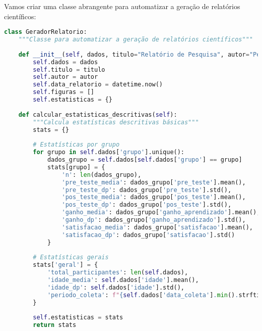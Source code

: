 \begin{examplebox}
Vamos criar uma classe abrangente para automatizar a geração de relatórios científicos:
\end{examplebox}

\begin{pythonbox}
\begin{lstlisting}[language=Python]
class GeradorRelatorio:
    """Classe para automatizar a geração de relatórios científicos"""
    
    def __init__(self, dados, titulo="Relatório de Pesquisa", autor="Pesquisador"):
        self.dados = dados
        self.titulo = titulo
        self.autor = autor
        self.data_relatorio = datetime.now()
        self.figuras = []
        self.estatisticas = {}
        
    def calcular_estatisticas_descritivas(self):
        """Calcula estatísticas descritivas básicas"""
        stats = {}
        
        # Estatísticas por grupo
        for grupo in self.dados['grupo'].unique():
            dados_grupo = self.dados[self.dados['grupo'] == grupo]
            stats[grupo] = {
                'n': len(dados_grupo),
                'pre_teste_media': dados_grupo['pre_teste'].mean(),
                'pre_teste_dp': dados_grupo['pre_teste'].std(),
                'pos_teste_media': dados_grupo['pos_teste'].mean(),
                'pos_teste_dp': dados_grupo['pos_teste'].std(),
                'ganho_media': dados_grupo['ganho_aprendizado'].mean(),
                'ganho_dp': dados_grupo['ganho_aprendizado'].std(),
                'satisfacao_media': dados_grupo['satisfacao'].mean(),
                'satisfacao_dp': dados_grupo['satisfacao'].std()
            }
        
        # Estatísticas gerais
        stats['geral'] = {
            'total_participantes': len(self.dados),
            'idade_media': self.dados['idade'].mean(),
            'idade_dp': self.dados['idade'].std(),
            'periodo_coleta': f"{self.dados['data_coleta'].min().strftime('%d/%m/%Y')} a {self.dados['data_coleta'].max().strftime('%d/%m/%Y')}"
        }
        
        self.estatisticas = stats
        return stats


    \end{lstlisting}
\end{pythonbox}

